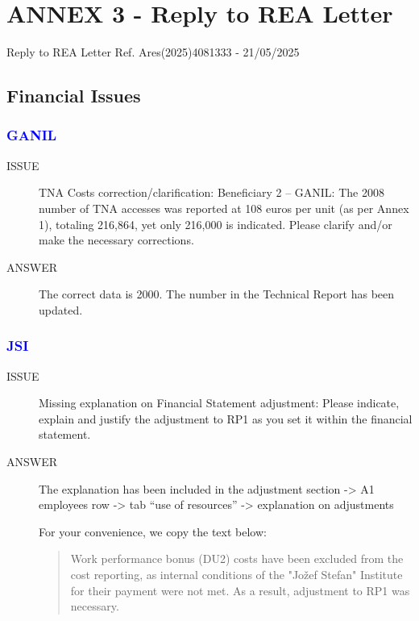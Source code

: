 %

\newpage
\section{ANNEX 3 - Reply to REA Letter} 

\begin{prtwo}
Reply to REA Letter Ref. Ares(2025)4081333 - 21/05/2025
\end{prtwo}

\subsection*{Financial Issues}

\begin{prtwo}
\subsubsection*{\textcolor{blue}{GANIL}}
\begin{description}
    \item[ISSUE] TNA Costs correction/clarification:
Beneficiary 2 – GANIL: The 2008 number of TNA accesses was reported at 108 euros per unit (as per Annex 1), totaling 216,864, yet only 216,000 is indicated. Please clarify and/or make the necessary corrections.

    \item[ANSWER] The correct data is 2000. The number in the Technical Report has been updated.
\end{description}
\end{prtwo}


\subsubsection*{\textcolor{blue}{JSI}}

\begin{prtwo}
\begin{description}
    \item[ISSUE] Missing explanation on Financial Statement adjustment:
Please indicate, explain and justify the adjustment to RP1 as you set it within the financial statement.

    \item[ANSWER] The explanation has been included in the adjustment section -> A1 employees row -> tab “use of resources” -> explanation on adjustments

For your convenience, we copy the text below:
\begin{quote}
    Work performance bonus (DU2) costs have been excluded from the cost reporting, as internal conditions of the "Jožef Stefan" Institute for their payment were not met. As a result, adjustment to RP1 was necessary.

\end{quote}
\end{description}
\end{prtwo}


